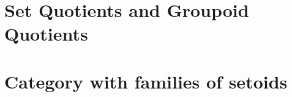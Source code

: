 \documentclass[11pt,a4paper,UKenglish,twoside,openright]{Thesis}
\begin{document}
\mainmatter %

\fancyfoot{}
\fancyhead[RO,LE]{\thepage}
\fancyhead[LO]{\leftmark}
\fancyhead[RE]{\rightmark}

\pagestyle{fancy} %







%



 



%





%



\appendix %




\chapter{Set Quotients and Groupoid Quotients}





\chapter{Category with families of setoids}
\end{document}
